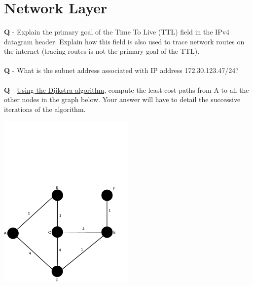 \documentclass{llncs}
\newcounter{ques}
\renewcommand{\question}[1]{\paragraph{}\textbf{Q\theques} - #1\stepcounter{ques} }
\newcommand{\answer}[1]{}%
\begin{document}
\newpage

\section{Network Layer}


\question{Explain the primary goal of the Time To Live (TTL) field in
  the IPv4 datagram header. Explain how this field is also
  used to trace network routes on the internet (tracing routes is not
  the primary goal of the TTL).}

\answer{The primary goal of TTL is to prevent datagrams from
  circulating forever in the network, for instance in case of routing
  loops among routers. The TTL is decremented by each router. When it
  reaches 0, the router destroys the datagram and sends an ICMP
  message to the source. To trace the route between a source and a
  destination, the traceroute program sends datagrams with increasing
  TTLs (starting at 1) so that it receives ICMP messages from all the
  routers on the path to the destination and can thus retrieve their
  IP addressesx. }

\newpage

\question{What is the subnet address associated with IP address
  172.30.123.47/24?}

\answer{The \texttt{/24} suffix indicates that the first 24 bits,
  i.e. 3 bytes, are allocated to the subnet. Therefore the subnet
  address is 172.30.123.0.}

\newpage
  \setlength{\tabcolsep}{12pt}
\question{\underline{Using the Dijkstra algorithm}, compute the least-cost
  paths from A to all the other nodes in the graph below. Your answer
  will have to detail the successive iterations of the algorithm.}

\includegraphics[width=0.5\textwidth]{graph.pdf}
\end{document}
